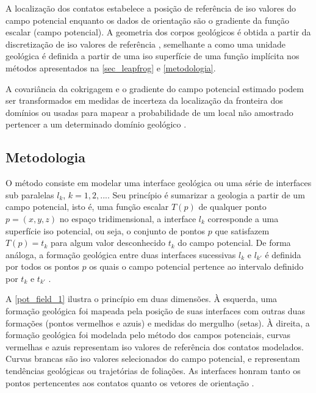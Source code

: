 A localização dos contatos estabelece a posição de referência de iso valores do campo potencial enquanto os dados de orientação são o gradiente da função escalar (campo potencial). A geometria dos corpos geológicos é obtida a partir da discretização de iso valores de referência \cite{calcagno2008geological}, semelhante a como uma unidade geológica é definida a partir de uma iso superfície de uma função implícita nos métodos apresentados na \autoref{sec_leapfrog} e \autoref{metodologia}. 

A covariância da cokrigagem e o gradiente do campo potencial estimado podem ser transformados em medidas de incerteza da localização da fronteira dos domínios ou usadas para mapear a probabilidade de um local não amostrado pertencer a um determinado domínio geológico \cite{renard2013modeling}.

\subsection{Metodologia}

O método consiste em modelar uma interface geológica ou uma série de interfaces sub paralelas $l_k$, $k=1,2,...$. Seu princípio é sumarizar a geologia a partir de um campo potencial, isto é, uma função escalar $T(p)$ de qualquer ponto $p=(x,y,z)$ no espaço tridimensional, a interface $l_k$ corresponde a uma superfície iso potencial, ou seja, o conjunto de pontos $p$ que satisfazem $T(p)=t_k$ para algum valor desconhecido $t_k$ do campo potencial. De forma análoga, a formação geológica entre duas interfaces sucessivas $l_k$ e $l_{k'}$ é definida por todos os pontos $p$ os quais o campo potencial pertence ao intervalo definido por $t_k$ e $t_{k'}$ \cite{chiles2004modelling}. 

A \autoref{pot_field_1} ilustra o princípio em duas dimensões. À esquerda, uma formação geológica foi mapeada pela posição de suas interfaces com outras duas formações (pontos vermelhos e azuis) e medidas do mergulho (setas). À direita, a formação geológica foi modelada pelo método dos campos potenciais, curvas vermelhas e azuis representam iso valores de referência dos contatos modelados. Curvas brancas são iso valores selecionados do campo potencial, e representam tendências geológicas ou trajetórias de foliações. As interfaces honram tanto os pontos pertencentes aos contatos quanto os vetores de orientação \cite{calcagno2008geological}.

